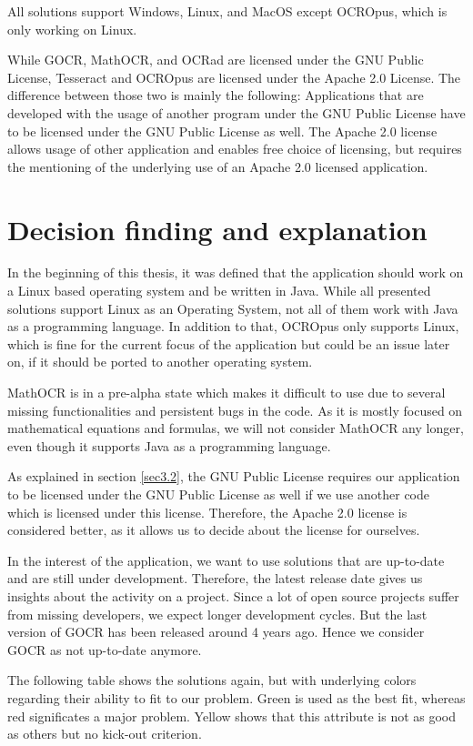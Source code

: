 All solutions support Windows, Linux, and MacOS except OCROpus, which is only working on Linux.

While GOCR, MathOCR, and OCRad are licensed under the GNU Public License, Tesseract and OCROpus are licensed under the Apache 2.0 License. The difference between those two is mainly the following: Applications that are developed with the usage of another program under the GNU Public License have to be licensed under the GNU Public License as well. The Apache 2.0 license allows usage of other application and enables free choice of licensing, but requires the mentioning of the underlying use of an Apache 2.0 licensed application.

\label{OCRDecision}
\section{Decision finding and explanation}
In the beginning of this thesis, it was defined that the application should work on a Linux based operating system and be written in Java. While all presented solutions support Linux as an Operating System, not all of them work with Java as a programming language. In addition to that, OCROpus only supports Linux, which is fine for the current focus of the application but could be an issue later on, if it should be ported to another operating system.

MathOCR is in a pre-alpha state which makes it difficult to use due to several missing functionalities and persistent bugs in the code. As it is mostly focused on mathematical equations and formulas, we will not consider MathOCR any longer, even though it supports Java as a programming language. 

As explained in section \ref{sec3.2}, the GNU Public License requires our application to be licensed under the GNU Public License as well if we use another code which is licensed under this license. Therefore, the Apache 2.0 license is considered better, as it allows us to decide about the license for ourselves.

In the interest of the application, we want to use solutions that are up-to-date and are still under development. Therefore, the latest release date gives us insights about the activity on a project. Since a lot of open source projects suffer from missing developers, we expect longer development cycles. But the last version of GOCR has been released around 4 years ago. Hence we consider GOCR as not up-to-date anymore.

The following table shows the solutions again, but with underlying colors regarding their ability to fit to our problem. Green is used as the best fit, whereas red significates a major problem. Yellow shows that this attribute is not as good as others but no kick-out criterion. 

